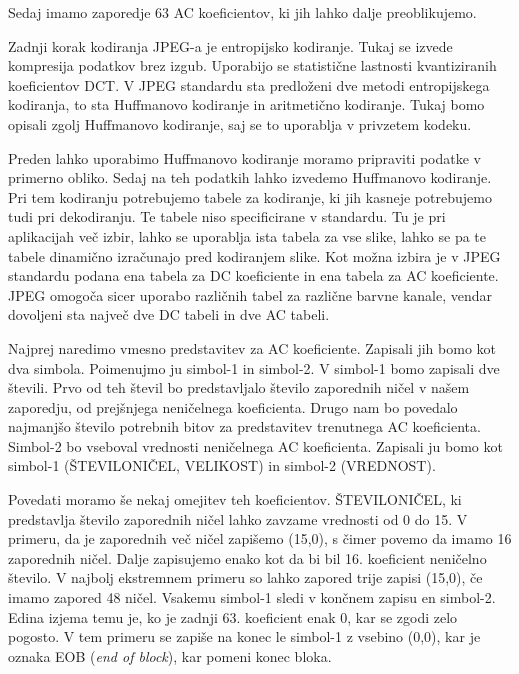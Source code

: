 \documentclass[a4paper,12pt,openright]{book}
\begin{document}
Sedaj imamo zaporedje 63 AC koeficientov, ki jih lahko dalje preoblikujemo.\par
Zadnji korak kodiranja JPEG-a je entropijsko kodiranje. Tukaj se izvede kompresija podatkov brez izgub. Uporabijo se statistične lastnosti kvantiziranih koeficientov DCT. V JPEG standardu sta predloženi dve metodi entropijskega kodiranja, to sta Huffmanovo kodiranje in aritmetično kodiranje. Tukaj bomo opisali zgolj Huffmanovo kodiranje, saj se to uporablja v privzetem kodeku.\par
Preden lahko uporabimo Huffmanovo kodiranje moramo pripraviti podatke v primerno obliko.
Sedaj na teh podatkih lahko izvedemo Huffmanovo kodiranje. Pri tem kodiranju potrebujemo tabele za kodiranje, ki jih kasneje potrebujemo tudi pri dekodiranju. Te tabele niso specificirane v standardu. Tu je pri aplikacijah več izbir, lahko se uporablja ista tabela za vse slike, lahko se pa te tabele dinamično izračunajo pred kodiranjem slike. Kot možna izbira je v JPEG standardu podana ena tabela za DC koeficiente in ena tabela za AC koeficiente. JPEG omogoča sicer uporabo različnih tabel za različne barvne kanale, vendar dovoljeni sta največ dve DC tabeli in dve AC tabeli.\par
Najprej naredimo vmesno predstavitev za AC koeficiente. Zapisali jih bomo kot dva simbola. Poimenujmo ju simbol-1 in simbol-2. V simbol-1 bomo zapisali dve števili. Prvo od teh števil bo predstavljalo število zaporednih ničel v našem zaporedju, od prejšnjega neničelnega koeficienta. Drugo nam bo povedalo najmanjšo število potrebnih bitov za predstavitev trenutnega AC koeficienta. Simbol-2 bo vseboval vrednosti neničelnega AC koeficienta. Zapisali ju bomo kot simbol-1 (ŠTEVILONIČEL, VELIKOST) in simbol-2 (VREDNOST).\par
Povedati moramo še nekaj omejitev teh koeficientov. ŠTEVILONIČEL, ki predstavlja število zaporednih ničel lahko zavzame vrednosti od 0 do 15. V primeru, da je zaporednih več ničel zapišemo (15,0), s čimer povemo da imamo 16 zaporednih ničel. Dalje zapisujemo enako kot da bi bil 16. koeficient neničelno število. V najbolj ekstremnem primeru so lahko zapored trije zapisi (15,0), če imamo zapored 48 ničel. Vsakemu simbol-1 sledi v končnem zapisu en simbol-2. Edina izjema temu je, ko je zadnji 63. koeficient enak 0, kar se zgodi zelo pogosto. V tem primeru se zapiše na konec le simbol-1 z vsebino (0,0), kar je oznaka EOB (\textit{end of block}), kar pomeni konec bloka.\par
\end{document}

